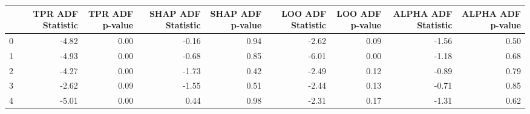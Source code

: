 \begin{tabular}{lrrrrrrrr}
\toprule
 & TPR ADF Statistic & TPR ADF p-value & SHAP ADF Statistic & SHAP ADF p-value & LOO ADF Statistic & LOO ADF p-value & ALPHA ADF Statistic & ALPHA ADF p-value \\
\midrule
0 & -4.82 & 0.00 & -0.16 & 0.94 & -2.62 & 0.09 & -1.56 & 0.50 \\
1 & -4.93 & 0.00 & -0.68 & 0.85 & -6.01 & 0.00 & -1.18 & 0.68 \\
2 & -4.27 & 0.00 & -1.73 & 0.42 & -2.49 & 0.12 & -0.89 & 0.79 \\
3 & -2.62 & 0.09 & -1.55 & 0.51 & -2.44 & 0.13 & -0.71 & 0.85 \\
4 & -5.01 & 0.00 & 0.44 & 0.98 & -2.31 & 0.17 & -1.31 & 0.62 \\
\bottomrule
\end{tabular}
